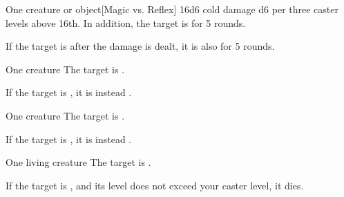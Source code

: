 \begin{spellheader}
    \spellrng{\rngclose}
\end{spellheader}
\begin{spelleffects}
    \begin{spelltarget}{One creature or object}[Magic vs. Reflex]
        \spellsuccess 16d6 cold damage \add d6 per three caster levels above 16th. In addition, the target is \slowed for 5 rounds.

        If the target is \bloodied after the damage is dealt, it is also \paralyzed for 5 rounds.
    \end{spelltarget}
\end{spelleffects}

\begin{spellheader}
    \spellrng{\rngclose}
    \spelldur{\durshort}
\end{spellheader}
\begin{spelleffects}
    \begin{spelltarget}{One creature}
        \spelleffect The target is \sickened.

        If the target is \bloodied, it is instead \blinded.
    \end{spelltarget}
\end{spelleffects}

\begin{spellheader}
    \spellrng{\rngclose}
    \spelldur{\durshort}
\end{spellheader}
\begin{spelleffects}
    \begin{spelltarget}{One creature}
        \spelleffect The target is \bewildered.

        If the target is \bloodied, it is instead \confused.
    \end{spelltarget}
\end{spelleffects}

\begin{spellheader}
    \spellrng{\rngclose}
    \spelldur{\durshort}
\end{spellheader}
\begin{spelleffects}
    \begin{spelltarget}{One living creature}
        \spelleffect The target is \sickened.

        If the target is \bloodied, and its level does not exceed your caster level, it dies.
    \end{spelltarget}
\end{spelleffects}

